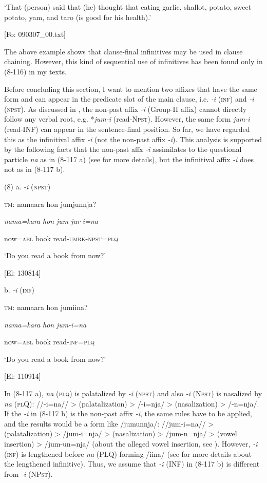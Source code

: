     ‘That (person) said that (he) thought that eating garlic, shallot, potato, sweet potato, yam, and taro (is good for his health).’

    [Fo: 090307\_00.txt]

The above example shows that clause-final infinitives may be used in clause chaining. However, this kind of sequential use of infinitives has been found only in (8-116) in my texts.

Before concluding this section, I want to mention two affixes that have the same form and can appear in the predicate slot of the main clause, i.e. \textit{{}-i} (\textsc{inf}) and \textit{{}-i} (\textsc{npst}). As discussed in , the non-past affix \textit{{}-i} (Group-II affix) cannot directly follow any verbal root, e.g. *\textit{jum-i} (read-N\textsc{pst}). However, the same form \textit{jum-i} (read-INF) can appear in the sentence-final position. So far, we have regarded this as the infinitival affix \textit{{}-i} (not the non-past affix \textit{{}-i}). This analysis is supported by the following facts that the non-past affx \textit{{}-i} assimilates to the questional particle \textit{na} as in (8-117 a) (see  for more details), but the infinitival affix \textit{{}-i} does not as in (8-117 b).

(8)  a.  \textit{{}-i} (\textsc{npst})

    \textsc{tm}:  namaara  hon  jumjunnja?

      \textit{nama=kara}  \textit{hon}  \textit{jum-jur-i=na}

      now=\textsc{abl}  book  read-\textsc{umrk}-\textsc{npst}=\textsc{plq}

      ‘Do you read a book from now?’

      [El: 130814]

  b.  \textit{{}-i} (\textsc{inf})

    \textsc{tm}:  namaara  hon  jumiina?

      \textit{nama=kara}  \textit{hon}  \textit{jum-i=na}

      now=\textsc{abl}  book  read-\textsc{inf}=\textsc{plq}

      ‘Do you read a book from now?’

      [El: 110914]

In (8-117 a), \textit{na} (\textsc{plq}) is palatalized by \textit{{}-i} (\textsc{npst}) and also \textit{{}-i} (N\textsc{pst}) is nasalized by \textit{na} (\textsc{pl}Q): //-i=na// > (palatalization) > /-i=nja/ > (nasalization) > /-n=nja/. If the \textit{{}-i} in (8-117 b) is the non-past affix \textit{{}-i}, the same rules have to be applied, and the results would be a form like /jumunnja/: //jum-i=na// > (palatalization) > /jum-i=nja/ > (nasalization) > /jum-n=nja/ > (vowel insertion) > /jum-un=nja/ (about the alleged vowel insertion, see ). However, \textit{{}-i} (\textsc{inf}) is lengthened before \textit{na} (PLQ) forming /iina/ (see  for more details about the lengthened infinitive). Thus, we assume that \textit{{}-i} (INF) in (8-117 b) is different from \textit{{}-i} (NP\textsc{st}).

